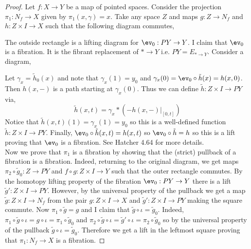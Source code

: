 \documentclass[12pt]{extarticle}
\begin{document}
\begin{proof}

Let $f : X \to Y$ be a map of pointed spaces. Consider the projection $\pi_1 : N_f \to X$ given by $\pi_1(x, \gamma) = x$. Take any space $Z$ and maps $g : Z \to N_f$ and $h : Z \times I \to X$ such that the following diagram commutes,
\begin{center}
\end{center}
The outside rectangle is a lifting diagram for $\ev_0 : PY \to Y$.
I claim that $\ev_0$ is a fibration. It is the fibrant replacement of $* \to Y$ i.e. $PY = E_{* \to Y}$. Consider a diagram,
\begin{center}
\end{center}
Let $\gamma_x = \tilde{h}_0(x)$ and note that $\gamma_x(1) = y_0$ and $\gamma_x(0) = \ev_0 \circ \tilde{h}(x) = h(x, 0)$. Then $h(x,-)$ is a path starting at $\gamma_x(0)$. Thus we can define $\tilde{h} : Z \times I \to PY$ via,
\[ \tilde{h}(x, t) = \gamma_x * (-h(x,-)|_{[0,t]}) \]
Notice that $\tilde{h}(x, t)(1) = \gamma_x(1) = y_0$ so this is a well-defined function $\tilde{h} : Z \times I \to PY$. Finally, $\ev_0 \circ \tilde{h}(x,t) = h(x,t)$ so $\ev_0 \circ \tilde{h} = h$ so this is a lift proving that $\ev_0$ is a fibration. See Hatcher 4.64 for more details. 
\bigskip\\
Now we prove that $\pi_1$ is a fibration by showing that the (strict) pullback of a fibration is a fibration. Indeed, returning to the original diagram, we get maps $\pi_2 \circ \tilde{g}_0 : Z \to PY$ and $f \circ g : Z \times I \to Y$ such that the outer rectangle commutes. By the homotopy lifting property of the fibration $\ev_0 : PY \to Y$ there is a lift $\tilde{g}' : Z \times I \to PY$. However, by the universal property of the pullback we get a map $\tilde{g} : Z \times I \to N_f$ from the pair $g : Z \times I \to X$ and $\tilde{g}' : Z \times I \to PY$ making the square commute. Now $\pi_1 \circ \tilde{g} = g$ and I claim that $\tilde{g} \circ \iota = \tilde{g}_0$. Indeed, $\pi_1 \circ \tilde{g} \circ \iota = g \circ \iota = \pi_1 \circ \tilde{g}_0$ and $\pi_2 \circ \tilde{g} \circ \iota = \tilde{g}' \circ \iota = \pi_2 \circ \tilde{g}_0$ so by the universal property of the pullback $\tilde{g} \circ \iota = \tilde{g}_0$. Therefore we get a lift in the leftmost square proving that $\pi_1 : N_f \to X$ is a fibration.

\end{proof}
\end{document}
